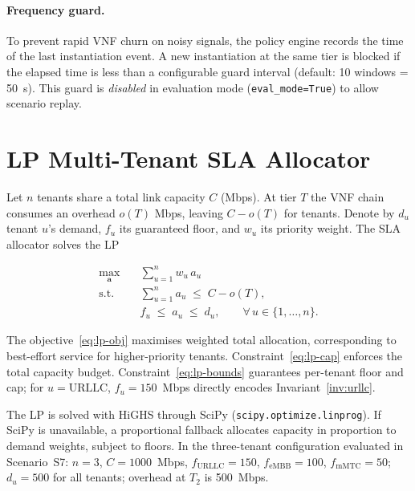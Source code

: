 \paragraph{Frequency guard.}
To prevent rapid VNF churn on noisy signals, the policy engine records
the time of the last instantiation event. A new instantiation at the same
tier is blocked if the elapsed time is less than a configurable guard
interval (default: 10 windows = 50~s). This guard is \emph{disabled}
in evaluation mode (\texttt{eval\_mode=True}) to allow scenario replay.

\section{LP Multi-Tenant SLA Allocator}
\label{sec:sla-lp}

Let $n$ tenants share a total link capacity $C$ (Mbps). At tier $T$
the VNF chain consumes an overhead $o(T)$ Mbps, leaving $C - o(T)$
for tenants. Denote by $d_u$ tenant $u$'s demand, $f_u$ its guaranteed
floor, and $w_u$ its priority weight. The SLA allocator solves the LP

\begin{align}
  \max_{\mathbf{a}} &\quad \sum_{u=1}^{n} w_u \, a_u
  \label{eq:lp-obj} \\
  \text{s.t.} &\quad \sum_{u=1}^{n} a_u \;\leq\; C - o(T),
  \label{eq:lp-cap} \\
  &\quad f_u \;\leq\; a_u \;\leq\; d_u,
  \qquad \forall\, u \in \{1,\ldots,n\}.
  \label{eq:lp-bounds}
\end{align}

The objective~\eqref{eq:lp-obj} maximises weighted total allocation,
corresponding to best-effort service for higher-priority tenants.
Constraint~\eqref{eq:lp-cap} enforces the total capacity budget.
Constraint~\eqref{eq:lp-bounds} guarantees per-tenant floor and cap;
for $u = \text{URLLC}$, $f_u = 150$~Mbps directly encodes
Invariant~\ref{inv:urllc}.

The LP is solved with HiGHS through SciPy
(\texttt{scipy.optimize.linprog}). If SciPy is unavailable, a
proportional fallback allocates capacity in proportion to demand
weights, subject to floors. In the three-tenant configuration
evaluated in Scenario~S7: $n = 3$, $C = 1000$~Mbps,
$f_{\text{URLLC}} = 150$, $f_{\text{eMBB}} = 100$,
$f_{\text{mMTC}} = 50$; $d_u = 500$ for all tenants; overhead at
$T_2$ is 500~Mbps.

